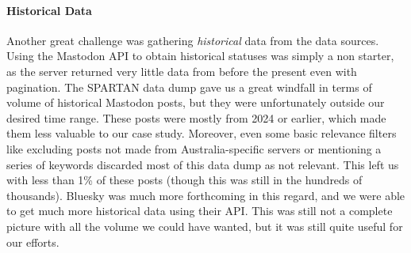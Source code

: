 \paragraph{Historical Data} Another great challenge was gathering \textit{historical} data from the data sources. Using the Mastodon API to obtain historical statuses was simply a non starter, as the server returned very little data from before the present even with pagination. The SPARTAN data dump gave us a great windfall in terms of volume of historical Mastodon posts, but they were unfortunately outside our desired time range. These posts were mostly from 2024 or earlier, which made them less valuable to our case study. Moreover, even some basic relevance filters like excluding posts not made from Australia-specific servers or mentioning a series of keywords discarded most of this data dump as not relevant. This left us with less than 1\% of these posts (though this was still in the hundreds of thousands). Bluesky was much more forthcoming in this regard, and we were able to get much more historical data using their API. This was still not a complete picture with all the volume we could have wanted, but it was still quite useful for our efforts.





